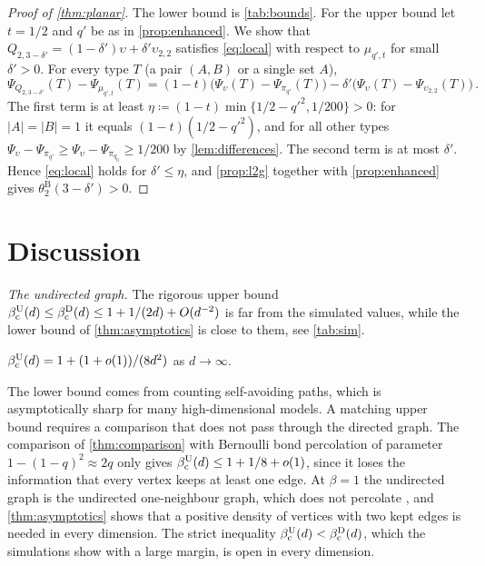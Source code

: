 \documentclass[11pt,letterpaper]{article}
\begin{document}
\begin{proof}[Proof of \cref{thm:planar}]
The lower bound is \cref{tab:bounds}. For the upper bound let $t=1/2$ and $q'$ be as in \cref{prop:enhanced}. We show that $Q_{2,3-\delta'}=(1-\delta')\upsilon+\delta'\upsilon_{2,2}$ satisfies \eqref{eq:local} with respect to $\mu_{q',t}$ for small $\delta'>0$. For every type $T$ (a pair $(A,B)$ or a single set $A$),
\begin{equation*}
\Psi_{Q_{2,3-\delta'}}(T)-\Psi_{\mu_{q',t}}(T)=(1-t)\big(\Psi_\upsilon(T)-\Psi_{\pi_{q'}}(T)\big)-\delta'\big(\Psi_\upsilon(T)-\Psi_{\upsilon_{2,2}}(T)\big)\,.
\end{equation*}
The first term is at least $\eta\coloneqq(1-t)\min\{1/2-q'^2,1/200\}>0$: for $|A|=|B|=1$ it equals $(1-t)(1/2-q'^2)$, and for all other types $\Psi_\upsilon-\Psi_{\pi_{q'}}\ge\Psi_\upsilon-\Psi_{\pi_{q_0}}\ge1/200$ by \cref{lem:differences}. The second term is at most $\delta'$. Hence \eqref{eq:local} holds for $\delta'\le\eta$, and \cref{prop:l2g} together with \cref{prop:enhanced} gives $\theta^{\mathrm B}_2(3-\delta')>0$.
\end{proof}

\section{Discussion}\label{sec:discussion}

\emph{The undirected graph.} The rigorous upper bound $\beta_{\mathrm c}^{\mathrm U}(d)\le\beta_{\mathrm c}^{\mathrm D}(d)\le1+1/(2d)+O(d^{-2})$ is far from the simulated values, while the lower bound of \cref{thm:asymptotics} is close to them, see \cref{tab:sim}.

\begin{conjecture}\label{conj:undirected}
$\beta_{\mathrm c}^{\mathrm U}(d)=1+(1+o(1))/(8d^2)$ as $d\to\infty$.
\end{conjecture}

The lower bound comes from counting self-avoiding paths, which is asymptotically sharp for many high-dimensional models. A matching upper bound requires a comparison that does not pass through the directed graph. The comparison of \cref{thm:comparison} with Bernoulli bond percolation of parameter $1-(1-q)^2\approx2q$ only gives $\beta_{\mathrm c}^{\mathrm U}(d)\le1+1/8+o(1)$, since it loses the information that every vertex keeps at least one edge. At $\beta=1$ the undirected graph is the undirected one-neighbour graph, which does not percolate \cite[Proposition~2.5]{JKLT25}, and \cref{thm:asymptotics} shows that a positive density of vertices with two kept edges is needed in every dimension. The strict inequality $\beta_{\mathrm c}^{\mathrm U}(d)<\beta_{\mathrm c}^{\mathrm D}(d)$, which the simulations show with a large margin, is open in every dimension.
\end{document}
